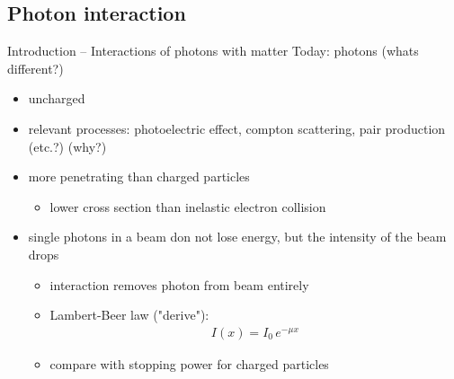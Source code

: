 \documentclass[11pt,xcolor=dvipsnames,professionalfonts]{beamer}
\begin{document}
\subsection{Photon interaction}

\begin{frame}{Introduction -- Interactions of photons with matter}
	Today: photons (whats different?)
	\begin{itemize}
		\item uncharged
		
		\item relevant processes: photoelectric effect, compton scattering, pair production (etc.?) (why?)
		
		\item more penetrating than charged particles 
		\begin{itemize}
			\item lower cross section than inelastic electron collision
		\end{itemize}
		
		\item single photons in a beam don not lose energy, but the intensity of the beam drops
		\begin{itemize}
			\item interaction removes photon from beam entirely
			
			\item Lambert-Beer law ("derive"):
			\begin{align*}
				I(x) = I_0 \, e^{- \mu x}
			\end{align*}
			
			\item compare with stopping power for charged particles
		\end{itemize}
	\end{itemize}
\end{frame}
\end{document}
